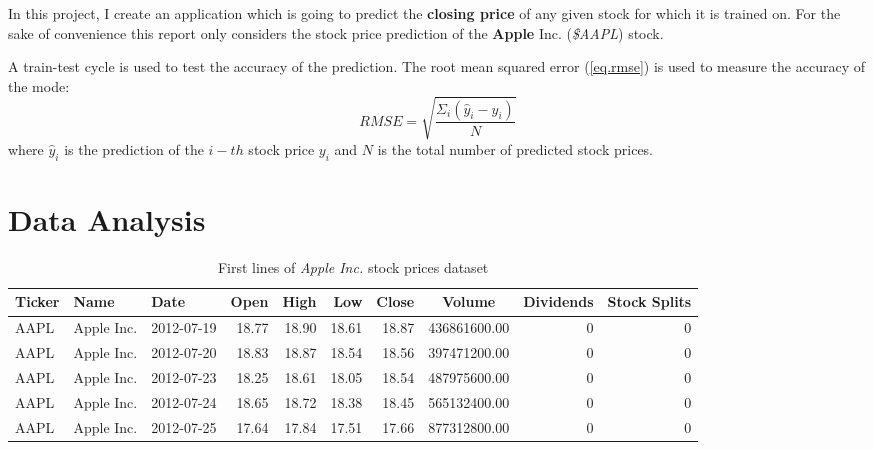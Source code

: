 \documentclass[fleqn,10pt]{SelfArx} %
\begin{document}
In this project, I create an application which is going to predict the \textbf{closing price} of any given stock for which it is trained on. For the sake of convenience this report only considers the stock price prediction of the \textbf{Apple} Inc. (\textit{\$AAPL}) stock.

A train-test cycle is used to test the accuracy of the prediction. The root mean squared error (\ref{eq.rmse}) is used to measure the accuracy of the mode:
\begin{equation}
RMSE = \sqrt{\dfrac{\Sigma_{i}(\hat{y}_i-y_i)}{N}} 
\label{eq.rmse}
\end{equation}
where $\hat{y}_i$ is the prediction of the $i-th$ stock price $y_i$ and $N$ is the total number of predicted stock prices.



\section{Data Analysis}

\begin{table*}[hbt]
	\caption{First lines of \textit{Apple Inc.} stock prices dataset}
	\centering
\begin{tabular}{lllrrrr S[table-auto-round,table-format=9.0] rr}
\toprule
Ticker &       Name &       Date &  Open &  High &   Low &  Close &       {Volume} &  Dividends &  Stock Splits \\
\midrule
  AAPL & Apple Inc. & 2012-07-19 & 18.77 & 18.90 & 18.61 &  18.87 & 436861600.00 &       0 &          0 \\
  AAPL & Apple Inc. & 2012-07-20 & 18.83 & 18.87 & 18.54 &  18.56 & 397471200.00 &       0 &          0 \\
  AAPL & Apple Inc. & 2012-07-23 & 18.25 & 18.61 & 18.05 &  18.54 & 487975600.00 &       0 &          0 \\
  AAPL & Apple Inc. & 2012-07-24 & 18.65 & 18.72 & 18.38 &  18.45 & 565132400.00 &       0 &          0 \\
  AAPL & Apple Inc. & 2012-07-25 & 17.64 & 17.84 & 17.51 &  17.66 & 877312800.00 &       0 &          0 \\
\bottomrule
\end{tabular}
	\label{tab:df.head}
\end{table*}
\end{document}
